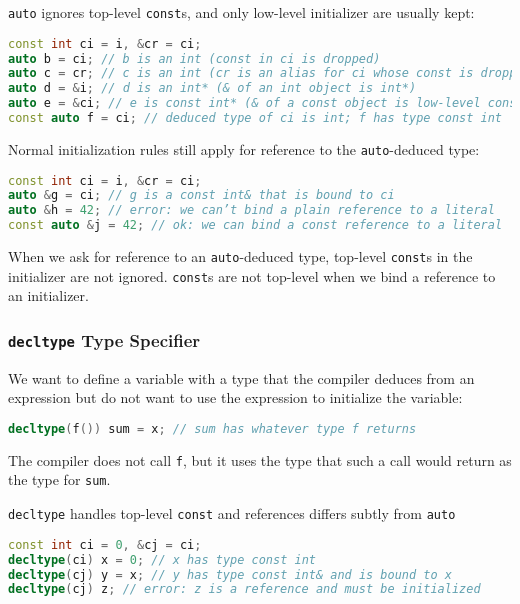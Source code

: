 \texttt{auto} ignores top-level \texttt{const}s, and only low-level initializer are usually kept:
\begin{lstlisting}[language=C++]
const int ci = i, &cr = ci; 
auto b = ci; // b is an int (const in ci is dropped) 
auto c = cr; // c is an int (cr is an alias for ci whose const is dropped) 
auto d = &i; // d is an int* (& of an int object is int*) 
auto e = &ci; // e is const int* (& of a const object is low-level const)
const auto f = ci; // deduced type of ci is int; f has type const int
\end{lstlisting}

Normal initialization rules still apply for reference to the \texttt{auto}-deduced type:
\begin{lstlisting}[language=C++]
const int ci = i, &cr = ci; 
auto &g = ci; // g is a const int& that is bound to ci 
auto &h = 42; // error: we can’t bind a plain reference to a literal 
const auto &j = 42; // ok: we can bind a const reference to a literal
\end{lstlisting}
When we ask for reference to an \texttt{auto}-deduced type, top-level \texttt{const}s in the initializer are not ignored. \texttt{const}s are not top-level when we bind a reference to an initializer.

\subsubsection{\texttt{decltype} Type Specifier}

We want to define a variable with a type that the compiler deduces from an expression but do not want to use the expression to initialize the variable:
\begin{lstlisting}[language=C++]
decltype(f()) sum = x; // sum has whatever type f returns
\end{lstlisting}
The compiler does not call \texttt{f}, but it uses the type that such a call would return as the type for \texttt{sum}.

\texttt{decltype} handles top-level \texttt{const} and references differs subtly from \texttt{auto}
\begin{lstlisting}[language=C++]
const int ci = 0, &cj = ci; 
decltype(ci) x = 0; // x has type const int 
decltype(cj) y = x; // y has type const int& and is bound to x 
decltype(cj) z; // error: z is a reference and must be initialized
\end{lstlisting}


